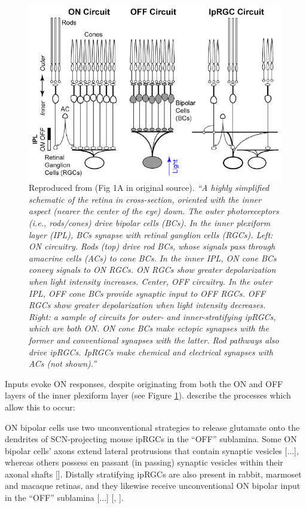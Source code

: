 \begin{figure}[htbp]
\includegraphics[max width=\textwidth, center]{figs/LitRev/do.png}
\caption{Reproduced from \citet{do_melanopsin_2019} (Fig 1A in original source). \textit{``A highly simplified schematic of the retina in cross-section, oriented with the inner aspect (nearer the center of the eye) down. The outer photoreceptors (i.e., rods/cones) drive bipolar cells (BCs). In the inner plexiform layer (IPL), BCs synapse with retinal ganglion cells (RGCs). Left: ON circuitry. Rods (top) drive rod BCs, whose signals pass through amacrine cells (ACs) to cone BCs. In the inner IPL, ON cone BCs convey signals to ON RGCs. ON RGCs show greater depolarization when light intensity increases. Center, OFF circuitry. In the outer IPL, OFF cone BCs provide synaptic input to OFF RGCs. OFF RGCs show greater depolarization when light intensity decreases. Right: a sample of circuits for outer- and inner-stratifying ipRGCs, which are both ON. ON cone BCs make ectopic synapses with the former and conventional synapses with the latter. Rod pathways also drive ipRGCs. IpRGCs make chemical and electrical synapses with ACs (not shown).''}}
\label{fig:do}
\end{figure}

Inputs evoke ON responses, despite originating from both the ON and OFF layers of the inner plexiform layer (see Figure \ref{fig:do}). \citet{graham_melanopsin-expressing_2016} describe the processes which allow this to occur: 

\begin{itquote}{}
ON bipolar cells use two unconventional strategies to release glutamate onto the dendrites of SCN-projecting mouse ipRGCs in the “OFF” sublamina. Some ON bipolar cells’ axons extend lateral protrusions that contain synaptic vesicles [...], whereas others possess en passant (in passing) synaptic vesicles within their axonal shafts [\citet{dumitrescu_ectopic_2009}]. Distally stratifying ipRGCs are also present in rabbit, marmoset and macaque retinas, and they likewise receive unconventional ON bipolar input in the “OFF” sublamina [...] [\citet{hoshi_inputs_2009}, \citet{grunert_bipolar_2011}].
\end{itquote}

